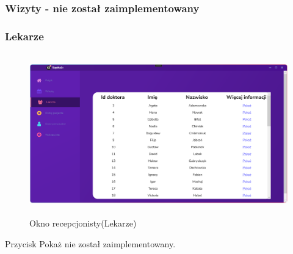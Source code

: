 \begin{flushleft}
    \subsubsection{\large{Wizyty - nie został zaimplementowany}}
    \subsubsection{\large{Lekarze}}
    \begin{figure}[H]
        \begin{center}
	\includegraphics[height=7cm]{images/recep_lekarze.png}
        \caption{Okno recepcjonisty(Lekarze)}
        \label{fig:recep_lekarze}
	\end{center}
    \end{figure}
    \hspace{5mm}Przycisk \textquotedbl Pokaż\textquotedbl{} nie został zaimplementowany.

\end{flushleft}
